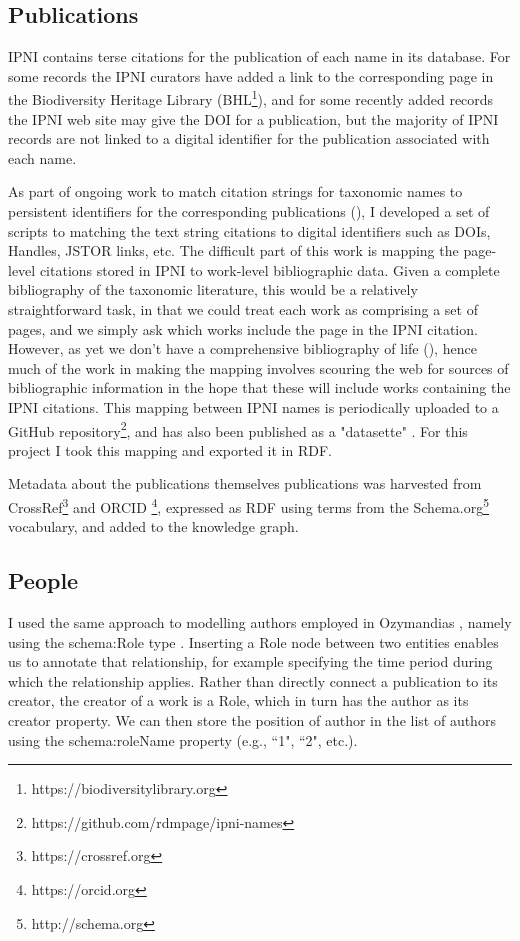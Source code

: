 \documentclass[runningheads]{llncs}
\begin{document}
\subsection{Publications}

IPNI contains terse citations for the publication of each name in its database. For some records the IPNI curators have added a link to the corresponding page in the Biodiversity Heritage Library (BHL\footnote{https://biodiversitylibrary.org}), and for some recently added records the IPNI web site may give the DOI for a publication, but the majority of IPNI records are not linked to a digital identifier for the publication associated with each name.

As part of ongoing work to match citation strings for taxonomic names to persistent identifiers for the corresponding publications (\cite{page_liberating_2018}), I developed a set of scripts to matching the text string citations to digital identifiers such as DOIs, Handles, JSTOR links, etc. The difficult part of this work is mapping the page-level citations stored in IPNI to work-level bibliographic data. Given a complete bibliography of the taxonomic literature, this would be a relatively straightforward task, in that we could treat each work as comprising a set of pages, and we simply ask which works include the page in the IPNI citation. However, as yet we don’t have a comprehensive bibliography of life (\cite{king_towards_2011}), hence much of the work in making the mapping involves scouring the web for sources of bibliographic information in the hope that these will include works containing the IPNI citations. This mapping between IPNI names is periodically uploaded to a GitHub repository\footnote{https://github.com/rdmpage/ipni-names}, and has also been published as a "datasette" \cite{page_liberating_2018}. For this project I took this mapping and exported it in RDF. 

Metadata about the publications themselves publications was harvested from CrossRef\footnote{https://crossref.org} and ORCID \footnote{https://orcid.org}, expressed as RDF using terms from the Schema.org\footnote{http://schema.org} vocabulary, and added to the knowledge graph. 

\subsection{People}

I used the same approach to modelling authors employed in Ozymandias \cite{page_ozymandias:_2019}, namely using the schema:Role type \cite{holland_introducing_2014}. Inserting a Role node between two entities enables us to annotate that relationship, for example specifying the time period during which the relationship applies. Rather than directly connect a publication to its creator, the creator of a work is a Role, which in turn has the author as its creator property. We can then store the position of author in the list of authors using the schema:roleName property (e.g., ``1", ``2", etc.).
\end{document}
